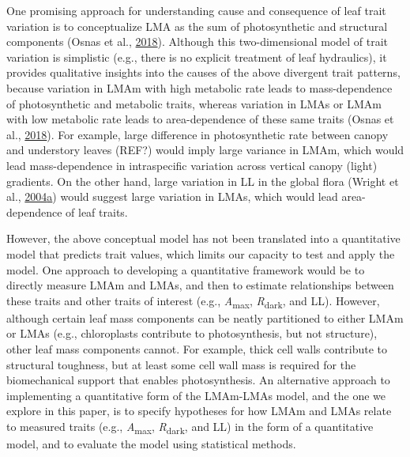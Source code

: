 \documentclass[12pt,]{article}
\theoremstyle{definition}
\theoremstyle{definition}
\theoremstyle{definition}
\theoremstyle{remark}
\begin{document}
One promising approach for understanding cause and consequence of leaf
trait variation is to conceptualize LMA as the sum of photosynthetic and
structural components (Osnas et al.,
\protect\hyperlink{ref-Osnas2018}{2018}). Although this two-dimensional
model of trait variation is simplistic (e.g., there is no explicit
treatment of leaf hydraulics), it provides qualitative insights into the
causes of the above divergent trait patterns, because variation in LMAm
with high metabolic rate leads to mass-dependence of photosynthetic and
metabolic traits, whereas variation in LMAs or LMAm with low metabolic
rate leads to area-dependence of these same traits (Osnas et al.,
\protect\hyperlink{ref-Osnas2018}{2018}). For example, large difference
in photosynthetic rate between canopy and understory leaves (REF?) would
imply large variance in LMAm, which would lead mass-dependence in
intraspecific variation across vertical canopy (light) gradients. On the
other hand, large variation in LL in the global flora (Wright et al.,
\protect\hyperlink{ref-Wright2004a}{2004}\protect\hyperlink{ref-Wright2004a}{a})
would suggest large variation in LMAs, which would lead area-dependence
of leaf traits.

However, the above conceptual model has not been translated into a
quantitative model that predicts trait values, which limits our capacity
to test and apply the model. One approach to developing a quantitative
framework would be to directly measure LMAm and LMAs, and then to
estimate relationships between these traits and other traits of interest
(e.g., \emph{A}\textsubscript{max}, \emph{R}\textsubscript{dark}, and
LL). However, although certain leaf mass components can be neatly
partitioned to either LMAm or LMAs (e.g., chloroplasts contribute to
photosynthesis, but not structure), other leaf mass components cannot.
For example, thick cell walls contribute to structural toughness, but at
least some cell wall mass is required for the biomechanical support that
enables photosynthesis. An alternative approach to implementing a
quantitative form of the LMAm-LMAs model, and the one we explore in this
paper, is to specify hypotheses for how LMAm and LMAs relate to measured
traits (e.g., \emph{A}\textsubscript{max}, \emph{R}\textsubscript{dark},
and LL) in the form of a quantitative model, and to evaluate the model
using statistical methods.
\end{document}
